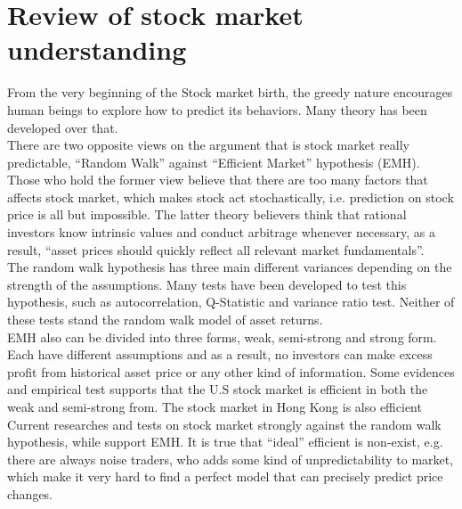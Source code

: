 \section{Review of stock market understanding}
\label{sec:mark_prediction}
From the very beginning of the Stock market birth, the greedy nature encourages human beings to explore how to predict its behaviors. Many theory has been developed over that.\\


There are two opposite views on the argument that is stock market really predictable, “Random Walk” against “Efficient Market” hypothesis (EMH)\cite[Section~3.2, p.~24]{1_shadbolttaylor_2002}. Those who hold the former view believe that there are too many factors that affects stock market, which makes stock act stochastically, i.e. prediction on stock price is all but impossible. The latter theory believers think that rational investors know intrinsic values and conduct arbitrage whenever necessary, as a result, “asset prices should quickly reflect all relevant market fundamentals”\cite[Chapter~1, p.~7]{1_wong_1997}.\\


The random walk hypothesis has three main different variances depending on the strength of the assumptions\cite[Section~3.2, p.~24--25]{1_shadbolttaylor_2002}. Many tests have been developed to test this hypothesis, such as autocorrelation, Q-Statistic and variance ratio test\cite[Section~3.4, p.~28--31]{1_shadbolttaylor_2002}. Neither of these tests stand the random walk model of asset returns.\\


EMH also can be divided into three forms\cite[Chapter~1, p.~7]{1_wong_1997}, weak, semi-strong and strong form. Each have different assumptions and as a result, no investors can make excess profit from historical asset price or any other kind of information. Some evidences and empirical test supports that the U.S stock market is efficient in both the weak and semi-strong from\cite[Chapter~1, p.~7--8]{1_wong_1997}. The stock market in Hong Kong is also efficient\cite{su2015efficiency}\\


Current researches and tests on stock market strongly against the random walk hypothesis, while support EMH. It is true that “ideal” efficient is non-exist, e.g. there are always noise traders\cite{de1990noise}, who adds some kind of unpredictability to market, which make it very hard to find a perfect model that can precisely predict price changes.

